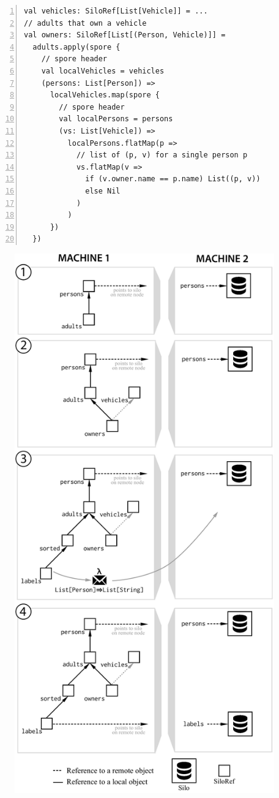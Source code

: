 \documentclass{jfp1}
\begin{document}
\begin{lstlisting}[numbers=left,xleftmargin=2em,framexleftmargin=1.5em]
val vehicles: SiloRef[List[Vehicle]] = ...
// adults that own a vehicle
val owners: SiloRef[List[(Person, Vehicle)]] =
  adults.apply(spore {
    // spore header
    val localVehicles = vehicles
    (persons: List[Person]) =>
      localVehicles.map(spore {
        // spore header
        val localPersons = persons
        (vs: List[Vehicle]) =>
          localPersons.flatMap(p =>
            // list of (p, v) for a single person p
            vs.flatMap(v =>
              if (v.owner.name == p.name) List((p, v))
              else Nil
            )
          )
      })
  })
\end{lstlisting}

\begin{figure}[ht!]
\centering\includegraphics[scale=0.35]{pic/bigger-dag.pdf}

\end{figure}
\end{document}
